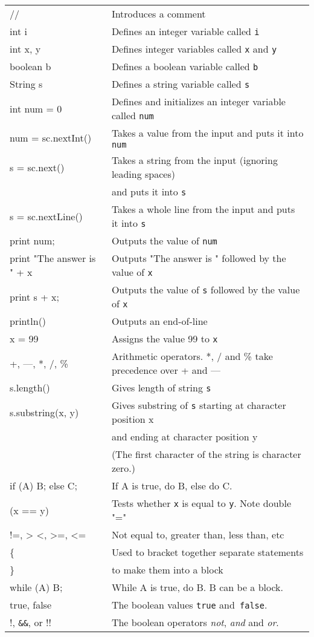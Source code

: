 \begin{tabular}{@{\ttfamily}l l}
// & Introduces a comment\\
int i & Defines an integer variable called \texttt{i}\\
int x, y & Defines integer variables called \texttt{x} and \texttt{y}\\
boolean b & Defines a boolean variable called \texttt{b}\\
String s & Defines a string variable called \texttt{s}\\
int num = 0 & Defines and initializes an integer variable called \texttt{num}\\
num = sc.nextInt() & Takes a value from the input and puts it into \texttt{num}\\
s = sc.next() & Takes a string from the input (ignoring leading spaces) \\
& and puts it into \texttt{s}\\
s = sc.nextLine() & Takes a whole line from the input and puts it into \texttt{s}\\
print num; & Outputs the value of \texttt{num}\\
print "The answer is " + x & Outputs "The answer is " followed by the value of \texttt{x}\\
print  s + x; & Outputs the value of \texttt{s} followed by the value of \texttt{x}\\
println() & Outputs an end-of-line\\
x = 99 & Assigns the value 99 to \texttt{x}\\
+, ---, *, /, \% & Arithmetic operators.  *, / and \% take precedence over + and ---\\
s.length() & Gives length of string \texttt{s}\\
s.substring(x, y) & Gives substring of \texttt{s} starting at character position x \\
& and ending at character position y\\
 & (The first character of the string is character zero.)\\
if (A) B; else C; & If A is true, do B, else do C.\\
(x == y) & Tests whether \texttt{x} is equal to \texttt{y}.  Note double "="\\
!=, > <, >=, <= & Not equal to, greater than, less than, etc\\
\{ & Used to bracket together separate statements\\
\} & to make them into a block\\
while (A) B; & While A is true, do B.  B can be a block.\\
true, false & The boolean values \texttt{true} and\texttt{ false}.\\
!, \verb+&&+, or !!  & The boolean operators \emph{not}, \emph{and} and \emph{or}.\\
\end{tabular}
\vspace*{5pt}

